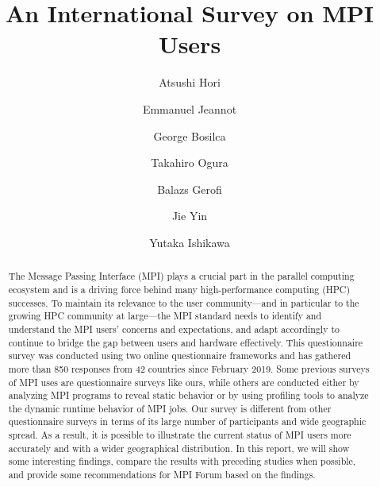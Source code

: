 \documentclass[preprint,5p,times]{elsarticle}
\begin{document}
\title{An International Survey on MPI Users}


\author[1]{Atsushi Hori}
\author[2]{Emmanuel Jeannot}
\author[3]{George Bosilca}
\author[1]{Takahiro Ogura}
\author[1]{Balazs Gerofi}
\author[1]{Jie Yin}
\author[1]{Yutaka Ishikawa}


\begin{abstract}
  The Message Passing Interface (MPI) plays a crucial part in the
  parallel computing ecosystem and is a driving force behind many
  high-performance computing (HPC) successes. To maintain its relevance
  to the user community---and in particular to the growing HPC community
  at large---the MPI standard needs to identify and understand the MPI
  users' concerns and expectations, and adapt
  accordingly to continue to bridge the gap between users
  and hardware effectively. This questionnaire survey was conducted
  using two online questionnaire frameworks and has gathered more than 850
  responses from 42 countries since February 2019.
  Some previous surveys of MPI uses are questionnaire surveys
  like ours, while others are conducted either by analyzing MPI programs
  to reveal static behavior or by using profiling tools to analyze the dynamic runtime behavior of
  MPI jobs. Our survey is different from
  other questionnaire surveys in terms of its large number of participants
  and wide geographic spread. As a result, it is possible to
  illustrate the current status of MPI users more accurately and with a
  wider geographical distribution. In this report, we will show some
  interesting findings, compare the results with preceding studies
  when possible, and provide some recommendations for MPI Forum
  based on the findings.
\end{abstract}
\end{document}
